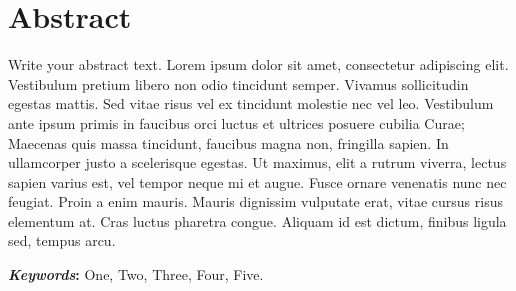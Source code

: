 \chapter*{\hfill{\centering Abstract}\hfill}
\vspace{0.5cm}
\justify
\normalsize

Write your abstract text. Lorem ipsum dolor sit amet, consectetur adipiscing elit. Vestibulum pretium libero non odio tincidunt semper. Vivamus sollicitudin egestas mattis. Sed vitae risus vel ex tincidunt molestie nec vel leo. Vestibulum ante ipsum primis in faucibus orci luctus et ultrices posuere cubilia Curae; Maecenas quis massa tincidunt, faucibus magna non, fringilla sapien. In ullamcorper justo a scelerisque egestas. Ut maximus, elit a rutrum viverra, lectus sapien varius est, vel tempor neque mi et augue. Fusce ornare venenatis nunc nec feugiat. Proin a enim mauris. Mauris dignissim vulputate erat, vitae cursus risus elementum at. Cras luctus pharetra congue. Aliquam id est dictum, finibus ligula sed, tempus arcu. 

\vspace{0.5cm}
\raggedright 
{\bf \textit{Keywords}:} One, Two, Three, Four, Five. 
